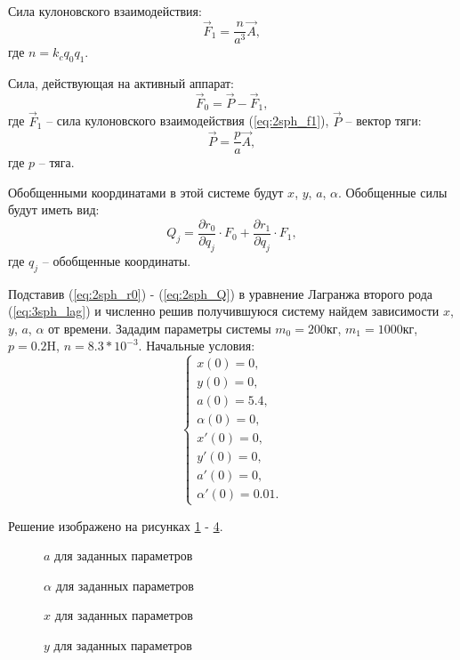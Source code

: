 Сила кулоновского взаимодействия:
\begin{equation}
\label{eq:2sph_f1}
	\vec{F}_1 = \frac{n}{a^3}\vec{A},
\end{equation}
где $n = k_c q_0 q_1$.

Сила, действующая на активный аппарат:
\begin{equation}
\label{eq:2sph_f0}
	\vec{F}_0 = \vec{P} - \vec{F}_1,
\end{equation}
где $\vec{F}_1$ – сила кулоновского взаимодействия (\ref{eq:2sph_f1}), $\vec{P}$ – вектор тяги:
\begin{equation}
\label{eq:2sph_P}
	\vec{P} = \frac{p}{a} \vec{A},
\end{equation}
где $p$ – тяга.

Обобщенными координатами в этой системе будут $x$, $y$, $a$, $\alpha$.
Обобщенные силы будут иметь вид:
\begin{equation}
\label{eq:2sph_Q}
	Q_j = \frac{\partial r_0}{\partial q_j} \cdot F_0 + \frac{\partial r_1}{\partial q_j} \cdot F_1,
\end{equation}
где $q_j$ – обобщенные координаты.

Подставив (\ref{eq:2sph_r0}) - (\ref{eq:2sph_Q}) в уравнение Лагранжа второго рода (\ref{eq:3sph_lag}) и численно решив получившуюся систему найдем зависимости $x$, $y$, $a$, $\alpha$ от времени.
Зададим параметры системы $m_0 = 200$кг, $m_1=1000$кг, $p=0.2$H, $n=8.3 * 10^{-3}$.
Начальные условия:
\begin{equation}
	\begin{cases}
		x(0) = 0, \\
		y(0) = 0, \\
		a(0) = 5.4, \\
		\alpha(0) = 0,\\
		x'(0) = 0, \\
		y'(0) = 0, \\
		a'(0) = 0, \\
		\alpha'(0) = 0.01.
	\end{cases}
\end{equation}

Решение изображено на рисунках \ref{ris:2sph_a_no_u} - \ref{ris:2sph_y_no_u}.

\begin{figure}[H]
	\caption{$a$ для заданных параметров}
	\label{ris:2sph_a_no_u}
\end{figure}
\begin{figure}[H]
	\caption{$\alpha$ для заданных параметров}
	\label{ris:2sph_alpha_no_u}
\end{figure} 
\begin{figure}[H]
	\caption{$x$ для заданных параметров}
	\label{ris:2sph_x_no_u}
\end{figure} 
\begin{figure}[H]
	\caption{$y$ для заданных параметров}
	\label{ris:2sph_y_no_u}
\end{figure} 

